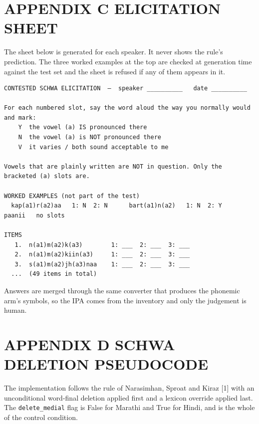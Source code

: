 \documentclass[12pt,a4paper]{article}
\begin{document}
\section*{APPENDIX C  ELICITATION SHEET}
The sheet below is generated for each speaker. It never shows the rule's prediction. The three worked examples at the top are checked at generation time against the test set and the sheet is refused if any of them appears in it.

\begin{Verbatim}[fontsize=\small,xleftmargin=1.5em]
CONTESTED SCHWA ELICITATION  —  speaker __________   date __________

For each numbered slot, say the word aloud the way you normally would and mark:
    Y  the vowel (a) IS pronounced there
    N  the vowel (a) is NOT pronounced there
    V  it varies / both sound acceptable to me

Vowels that are plainly written are NOT in question. Only the bracketed (a) slots are.

WORKED EXAMPLES (not part of the test)
  kap(a1)r(a2)aa   1: N  2: N      bart(a1)n(a2)   1: N  2: Y      paanii   no slots

ITEMS
   1.  n(a1)m(a2)k(a3)        1: ___  2: ___  3: ___
   2.  n(a1)m(a2)kiin(a3)     1: ___  2: ___  3: ___
   3.  s(a1)m(a2)jh(a3)naa    1: ___  2: ___  3: ___
  ...  (49 items in total)
\end{Verbatim}

Answers are merged through the same converter that produces the phonemic arm's symbols, so the IPA comes from the inventory and only the judgement is human.

\section*{APPENDIX D  SCHWA DELETION PSEUDOCODE}
The implementation follows the rule of Narasimhan, Sproat and Kiraz [1] with an unconditional word-final deletion applied first and a lexicon override applied last. The \texttt{delete\_medial} flag is False for Marathi and True for Hindi, and is the whole of the control condition.
\end{document}
